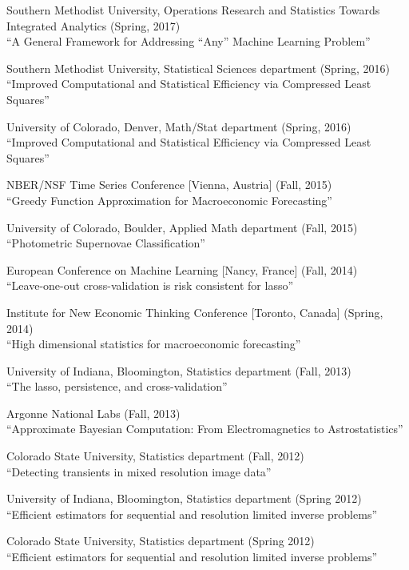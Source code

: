 \documentclass[10pt]{article}
\newenvironment{innerlist1}[1][\enskip\textbullet]%
{\vspace{-\baselineskip}\begin{compactitem}[#1]}{\end{compactitem}}
\begin{document}
\begin{innerlist1}%
\item Southern Methodist University, Operations Research and Statistics Towards Integrated Analytics (Spring, 2017)\\``A General Framework for Addressing ``Any'' Machine Learning Problem''
\item Southern Methodist University,  Statistical Sciences department (Spring, 2016)\\``Improved Computational and Statistical Efficiency via Compressed Least Squares''
\item University of Colorado, Denver,  Math/Stat department (Spring, 2016)\\``Improved Computational and Statistical Efficiency via Compressed Least Squares''
\item NBER/NSF Time Series  Conference [Vienna, Austria] (Fall, 2015)\\``Greedy Function Approximation for Macroeconomic Forecasting''
\item University of Colorado, Boulder,  Applied Math department (Fall, 2015)\\``Photometric Supernovae Classification''
\item European Conference on Machine Learning [Nancy, France] (Fall, 2014)\\``Leave-one-out cross-validation is risk consistent for lasso''
\item Institute for New Economic Thinking Conference  [Toronto, Canada] (Spring, 2014)\\``High dimensional statistics for macroeconomic forecasting''
\item University of Indiana, Bloomington, Statistics department (Fall, 2013)\\``The lasso, persistence, and cross-validation''
\item Argonne National Labs (Fall, 2013)\\``Approximate Bayesian Computation: From Electromagnetics to Astrostatistics''
\item Colorado State University, Statistics department (Fall, 2012)\\``Detecting transients in mixed resolution image data'' 
\item University of Indiana, Bloomington, Statistics department (Spring 2012)\\ ``Efficient estimators for sequential and resolution limited inverse problems'' 
\item Colorado State University, Statistics department  (Spring 2012)\\ ``Efficient estimators for sequential and resolution limited inverse problems''

\end{innerlist1}
\end{document}
